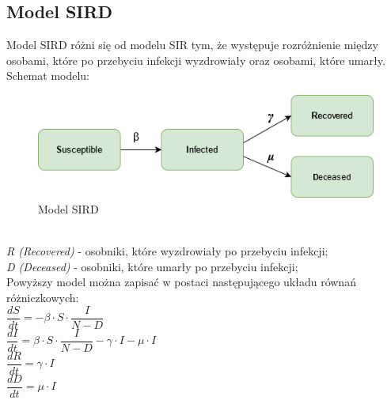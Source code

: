 \documentclass[12pt,a4paper]{article}
\begin{document}
\subsection{Model SIRD}
Model SIRD różni się od modelu SIR tym, że występuje rozróżnienie między osobami, które po przebyciu infekcji wyzdrowiały oraz osobami, które umarły.\\
Schemat modelu:
\begin{figure}[h!]
\centering
\includegraphics[width=1.0\textwidth]{Schematy/SIRD}
\caption{Model SIRD} 
\label{fig:Model SIRD}
\end{figure}\\
\textit{R (Recovered)} - osobniki, które wyzdrowiały po przebyciu infekcji;\\
\textit{D (Deceased)} - osobniki, które umarły po przebyciu infekcji;\\
Powyższy model można zapisać w postaci następującego układu równań różniczkowych:\\
$\dfrac{dS}{dt} = - \beta\cdot{S}\cdot\dfrac{I}{N-D}$\\
$\dfrac{dI}{dt} = \beta\cdot{S}\cdot\dfrac{I}{N-D} - \gamma\cdot{I} - \mu\cdot{I}$\\
$\dfrac{dR}{dt} = \gamma\cdot{I}$\\
$\dfrac{dD}{dt} = \mu\cdot{I}$
\end{document}
